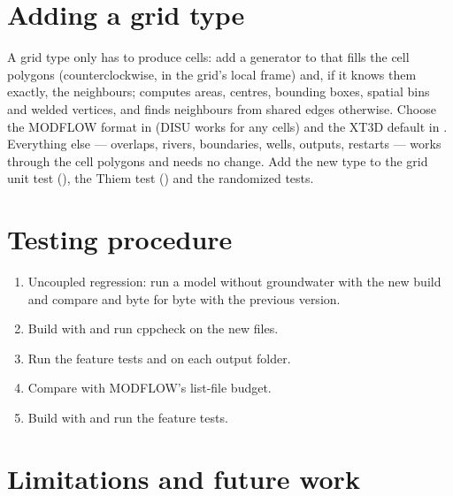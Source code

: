 \section{Adding a grid type}
A grid type only has to produce cells: add a generator to  that fills the cell polygons (counterclockwise, in the
grid's local frame) and, if it knows them exactly, the neighbours;  computes areas, centres, bounding boxes,
spatial bins and welded vertices, and finds neighbours from shared edges otherwise. Choose the MODFLOW format in
 (DISU works for any cells) and the XT3D default in . Everything else --- overlaps, rivers,
boundaries, wells, outputs, restarts --- works through the cell polygons and needs no change. Add the new type to the grid unit
test (), the Thiem test () and the randomized tests.

\section{Testing procedure}
\begin{enumerate}
\item Uncoupled regression: run a model without groundwater with the new build and compare  and
 byte for byte with the previous version.
\item Build with  and run cppcheck on the new files.
\item Run the feature tests and  on each output folder.
\item Compare with MODFLOW's list-file budget.
\item Build with  and run the feature tests.
\end{enumerate}

\section{Limitations and future work}\label{ch:limits}
